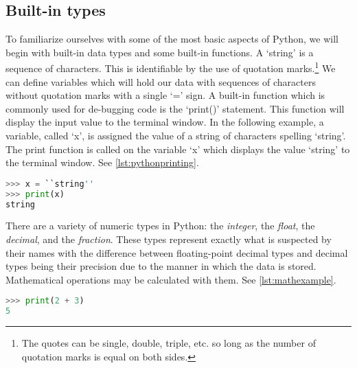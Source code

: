 \subsection{Built-in types}

To familiarize ourselves with some of the most basic aspects of Python, we will begin with built-in data types and some built-in functions. A `string' is a sequence of characters. This is identifiable by the use of quotation marks.\footnote{The quotes can be single, double, triple, etc. so long as the number of quotation marks is equal on both sides.} We can define variables which will hold our data with sequences of characters without quotation marks with a single `=' sign. A built-in function which is commonly used for de-bugging code is the `print()' statement. This function will display the input value to the terminal window. In the following example, a variable, called `x', is assigned the value of a string of characters spelling `string'. The print function is called on the variable `x' which displays the value `string' to the terminal window. See \autoref{lst:pythonprinting}.

\begin{lstlisting}[language=Python,frame=tb,caption={Printing a string to the terminal window},label=lst:pythonprinting]
>>> x = ``string''
>>> print(x)
string
\end{lstlisting}

There are a variety of numeric types in Python: the \textit{integer}, the \textit{float}, the \textit{decimal}, and the \textit{fraction}. These types represent exactly what is suspected by their names with the difference between floating-point decimal types and decimal types being their precision due to the manner in which the data is stored. Mathematical operations may be calculated with them. See \autoref{lst:mathexample}.

\begin{lstlisting}[language=Python,frame=tb,caption={Performing mathematical operations},label=lst:mathexample]
>>> print(2 + 3)
5
\end{lstlisting}

